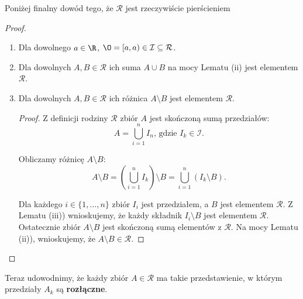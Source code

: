 \vspace{1.5em}
Poniżej finalny dowód tego, że $\mathcal{R}$ jest rzeczywiście pierścieniem
\begin{proof}
	\begin{enumerate}[label=\alph*)]
		\item Dla dowolnego $a\in \R$, $\O = [a,a) \in \mathcal{I}\subseteq \mathcal{R}$.
	        \item Dla dowolnych $A,B \in \mathcal{R}$ ich suma $A\cup B$ na mocy Lematu (ii) jest elementem $\mathcal{R}$.
		\item Dla dowolnych $A,B \in \mathcal{R}$ ich różnica $A\setminus B$ jest elementem $\mathcal{R}$.
		\begin{proof}
	Z definicji rodziny $\mathcal{R}$ zbiór $A$ jest skończoną sumą przedziałów:
\[
A = \bigcup_{i=1} ^{n}I_{n}\text{, gdzie } I_{k} \in \mathcal{I}
.\] 

Obliczamy różnicę $A\setminus B$:
\[
	A\setminus B = \left(\bigcup_{i=1} ^{n} I_{k}  \right) \setminus B = \bigcup_{i=1} ^{n}\left( I_{k}\setminus B \right)
.\] 

Dla każdego $i\in \{1,\ldots,n\} $ zbiór $I_{i}$ jest przedziałem, a  $B$ jest elementem $\mathcal{R}$. Z Lematu (iii)) wnioskujemy, że każdy składnik $I_{i}\setminus B$ jest elementem $\mathcal{R}$.
Ostatecznie zbiór $A\setminus B$ jest skończoną sumą elementów z $\mathcal{R}$. Na mocy Lematu (ii)), wnioskujemy, że $A\setminus B \in \mathcal{R}.$
		\end{proof} 
	\end{enumerate} 
\end{proof} 
Teraz udowodnimy, że każdy zbiór $A\in \mathcal{R}$ ma takie przedstawienie, w którym przedziały $A_{k}$ są \textbf{rozłączne}.
